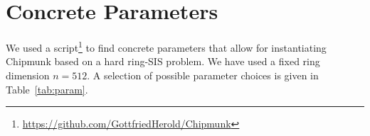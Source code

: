 
\section{Concrete Parameters}\label{sec:concreteparams}

We used a script\footnote{
\url{https://github.com/GottfriedHerold/Chipmunk}%
}
to find concrete parameters that allow for instantiating Chipmunk based on a hard ring-SIS problem.
We have used a fixed ring dimension $n = 512$.
A selection of possible parameter choices is given in Table~\ref{tab:param}.


